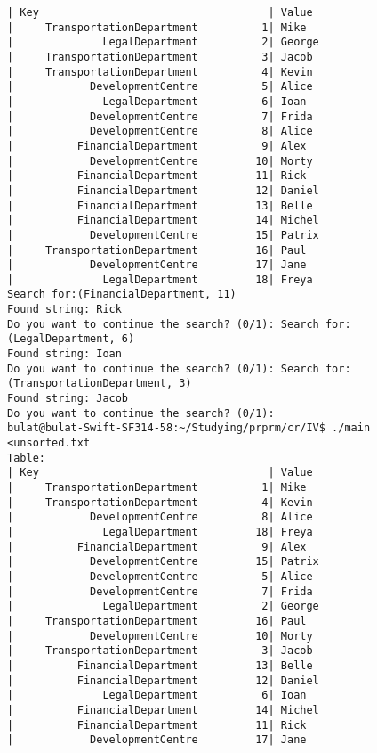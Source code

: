 \documentclass[a4paper]{article}
\newcounter{i}
\begin{document}
\begin{enumerate}[label=\textbf{\arabic*}.]
\begin{verbatim}
| Key                                    | Value
|     TransportationDepartment          1| Mike
|              LegalDepartment          2| George
|     TransportationDepartment          3| Jacob
|     TransportationDepartment          4| Kevin
|            DevelopmentCentre          5| Alice
|              LegalDepartment          6| Ioan
|            DevelopmentCentre          7| Frida
|            DevelopmentCentre          8| Alice
|          FinancialDepartment          9| Alex
|            DevelopmentCentre         10| Morty
|          FinancialDepartment         11| Rick
|          FinancialDepartment         12| Daniel
|          FinancialDepartment         13| Belle
|          FinancialDepartment         14| Michel
|            DevelopmentCentre         15| Patrix
|     TransportationDepartment         16| Paul
|            DevelopmentCentre         17| Jane
|              LegalDepartment         18| Freya
Search for:(FinancialDepartment, 11)
Found string: Rick
Do you want to continue the search? (0/1): Search for:(LegalDepartment, 6)
Found string: Ioan
Do you want to continue the search? (0/1): Search for:(TransportationDepartment, 3)
Found string: Jacob
Do you want to continue the search? (0/1): 
bulat@bulat-Swift-SF314-58:~/Studying/prprm/cr/IV$ ./main <unsorted.txt 
Table: 
| Key                                    | Value
|     TransportationDepartment          1| Mike
|     TransportationDepartment          4| Kevin
|            DevelopmentCentre          8| Alice
|              LegalDepartment         18| Freya
|          FinancialDepartment          9| Alex
|            DevelopmentCentre         15| Patrix
|            DevelopmentCentre          5| Alice
|            DevelopmentCentre          7| Frida
|              LegalDepartment          2| George
|     TransportationDepartment         16| Paul
|            DevelopmentCentre         10| Morty
|     TransportationDepartment          3| Jacob
|          FinancialDepartment         13| Belle
|          FinancialDepartment         12| Daniel
|              LegalDepartment          6| Ioan
|          FinancialDepartment         14| Michel
|          FinancialDepartment         11| Rick
|            DevelopmentCentre         17| Jane


\end{verbatim}
\end{enumerate}
\end{document}
